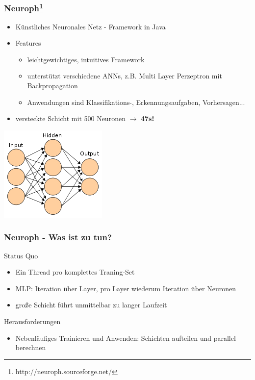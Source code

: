 \documentclass[18pt]{beamer}
\begin{document}
	\begin{frame}[c]\frametitle{Neuroph\footnote{http://neuroph.sourceforge.net/}}
		\begin{block}{}
		\begin{itemize}
			\item Künstliches Neuronales Netz - Framework in Java
			\item Features
			\begin {itemize}
				\item leichtgewichtiges, intuitives Framework
				\item unterstützt verschiedene ANNs, z.B. Multi Layer Perzeptron mit Backpropagation
				\item Anwendungen sind Klassifikations-, Erkennungsaufgaben, Vorhersagen...
			\end {itemize}
			\item versteckte Schicht mit 500 Neuronen $\rightarrow$ \textbf{47s!}
		\end {itemize}
		\end{block}
		\begin{center}
		\includegraphics[scale=0.4]{ann.png}
		\end{center}
	\end {frame}
	
	\begin{frame}[c]\frametitle{Neuroph - Was ist zu tun?}
		\begin{block}{Status Quo}
		    \begin{itemize}
		    	\item Ein Thread pro komplettes Traning-Set
		    	\item MLP: Iteration über Layer, pro Layer wiederum Iteration über Neuronen
		    	\item große Schicht führt unmittelbar zu langer Laufzeit
		    \end{itemize}
		\end{block}
		\begin{block}{Herausforderungen}
		    \begin{itemize}
		    	\item Nebenläufiges Trainieren und Anwenden: Schichten aufteilen und parallel berechnen
		    \end{itemize}
		\end{block}
	\end{frame}
\end{document}
